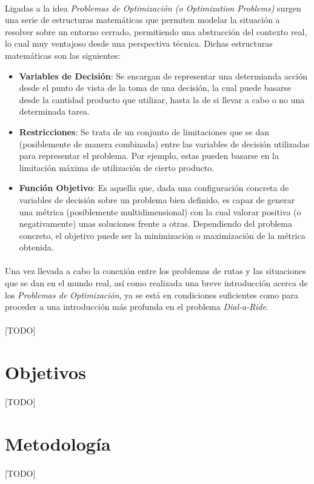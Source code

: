 \documentclass{subfiles}
\begin{document}
      \paragraph{}
      Ligadas a la idea \emph{Problemas de Optimización (o Optimization Problems)} surgen una serie de estructuras matemáticas que permiten modelar la situación a resolver sobre un entorno cerrado, permitiendo una abstracción del contexto real, lo cual muy ventajoso desde una perspectiva técnica. Dichas estructuras matemáticas son las siguientes:
      \begin{itemize}

        \item \textbf{Variables de Decisión}: Se encargan de representar una determianda acción desde el punto de vista de la toma de una decisión, la cual puede basarse desde la cantidad producto que utilizar, hasta la de si llevar a cabo o no una determinada tarea.

        \item \textbf{Restricciones}: Se trata de un conjunto de limitaciones que se dan (posiblemente de manera combinada) entre las variables de decisión utilizadas para representar el problema. Por ejemplo, estas pueden basarse en la limitación máxima de utilización de cierto producto.

        \item \textbf{Función Objetivo}: Es aquella que, dada una configuración concreta de variables de decisión sobre un problema bien definido, es capaz de generar una métrica (posiblemente multidimensional) con la cual valorar positiva (o negativamente) unas soluciones frente a otras. Dependiendo del problema concreto, el objetivo puede ser la minimización o maximización de la métrica obtenida.

      \end{itemize}

      \paragraph{}
      Una vez llevada a cabo la conexión entre los problemas de rutas y las situaciones que se dan en el mundo real, así como realizada una breve introducción acerca de los \emph{Problemas de Optimización}, ya se está en condiciones suficientes como para proceder a una introducción más profunda en el problema \emph{Dial-a-Ride}.

      \paragraph{}
      [TODO]

    \section{Objetivos}
    \label{sec:introduction_objectives}

      \paragraph{}
      [TODO]

    \section{Metodología}
    \label{sec:introduction_metodology}

      \paragraph{}
      [TODO]
\end{document}
